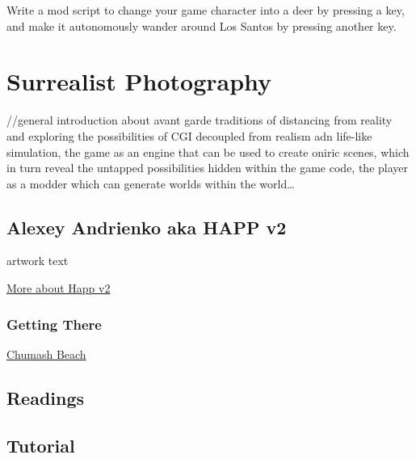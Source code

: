 \documentclass[
  openany]{book}
\begin{document}
Write a mod script to change your game character into a deer by pressing a key, and make it autonomously wander around Los Santos by pressing another key.

\hypertarget{surrealist-photography}{%
\chapter{Surrealist Photography}\label{surrealist-photography}}

//general introduction about avant garde traditions of distancing from reality and exploring the possibilities of CGI decoupled from realism adn life-like simulation, the game as an engine that can be used to create oniric scenes, which in turn reveal the untapped possibilities hidden within the game code, the player as a modder which can generate worlds within the world\ldots{}

\hypertarget{alexey-andrienko-aka-happ-v2}{%
\section*{Alexey Andrienko aka HAPP v2}\label{alexey-andrienko-aka-happ-v2}}

artwork text

\href{https://www.gamescenes.org/2018/02/game-art-happ-v2s-in-game-photography.html}{More about Happ v2}

\hypertarget{getting-there-7}{%
\subsection*{Getting There}\label{getting-there-7}}

\href{https://grandtheftdata.com/landmarks/\#-2629.132,626.461,4,atlas,name=beach,Chumash_Beach,_Chumash}{Chumash Beach}

\hypertarget{readings-4}{%
\section*{Readings}\label{readings-4}}

\hypertarget{tutorial-4}{%
\section*{Tutorial}\label{tutorial-4}}
\end{document}
